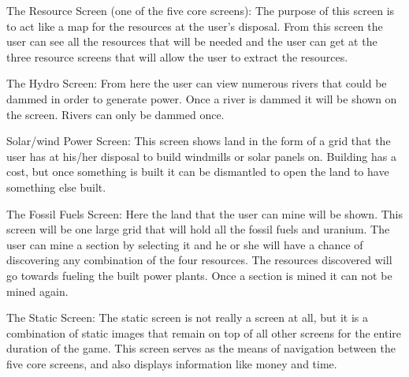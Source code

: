 \documentclass[msc,oneside]{ubcthesis}%
\begin{document}
\noindent The Resource Screen (one of the five core screens): \newline
\indent The purpose of this screen is to act like a map for the resources at the user's disposal. From this 
screen the user can see all the resources that will be needed and the user can get at the three resource 
screens that will allow the user to extract the resources.
\bigskip

\noindent The Hydro Screen: \newline
\indent From here the user can view numerous rivers that could be dammed in order to generate power. Once a 
river is dammed it will be shown on the screen. Rivers can only be dammed once. 
\bigskip

\noindent Solar/wind Power Screen: \newline
\indent This screen shows land in the form of a grid that the user has at his/her disposal to build windmills or solar panels on. Building has a cost, but once something is built it can be dismantled to open the land to have something else built. 
\bigskip


\noindent The Fossil Fuels Screen: \newline
\indent Here the land that the user can mine will be shown. This screen will be one large grid that will hold all the fossil fuels and uranium. The user can mine a section by selecting it and he or she will have a chance of discovering any combination of the four resources. The resources discovered will go towards fueling the built power plants. Once a section is mined it can not be mined again. 
\bigskip

\noindent The Static Screen: \newline
\indent The static screen is not really a screen at all, but it is a combination of static images that remain on top of all other screens for the entire duration of the game. This screen serves as the means of navigation between the five core screens, and also displays information like money and time. 
\bigskip


\end{document}
